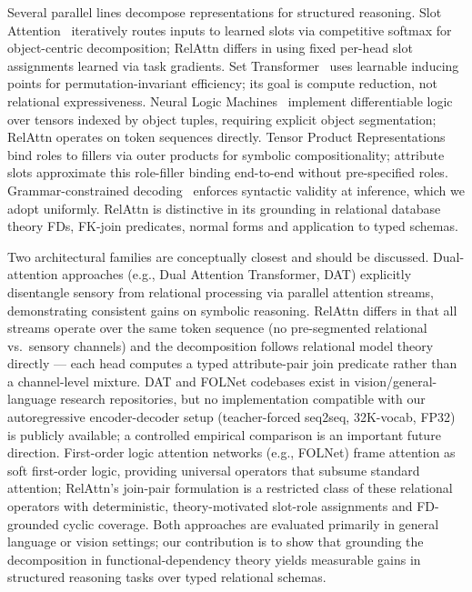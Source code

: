 \documentclass[review]{elsarticle}
\begin{document}
Several parallel lines decompose representations for structured reasoning. {Slot Attention}~\cite{locatello2020object} iteratively routes inputs to learned slots via competitive softmax for object-centric decomposition; RelAttn differs in using fixed per-head slot assignments learned via task gradients. {Set Transformer}~\cite{lee2019set} uses learnable inducing points for permutation-invariant efficiency; its goal is compute reduction, not relational expressiveness. {Neural Logic Machines}~\cite{dong2019nlm} implement differentiable logic over tensors indexed by object tuples, requiring explicit object segmentation; RelAttn operates on token sequences directly. {Tensor Product Representations}~\cite{smolensky1990tensor} bind roles to fillers via outer products for symbolic compositionality; attribute slots approximate this role-filler binding end-to-end without pre-specified roles. Grammar-constrained decoding~\cite{scholak2021picard} enforces syntactic validity at inference, which we adopt uniformly. RelAttn is distinctive in its grounding in relational database theory FDs, FK-join predicates, normal forms and application to typed schemas.

Two architectural families are conceptually closest and should be discussed. Dual-attention approaches (e.g., Dual Attention Transformer, DAT) explicitly disentangle sensory from relational processing via parallel attention streams, demonstrating consistent gains on symbolic reasoning. RelAttn differs in that all streams operate over the same token sequence (no pre-segmented relational vs.\ sensory channels) and the decomposition follows relational model theory directly --- each head computes a typed attribute-pair join predicate rather than a channel-level mixture. DAT and FOLNet codebases exist in vision/general-language research repositories, but no implementation compatible with our autoregressive encoder-decoder setup (teacher-forced seq2seq, 32K-vocab, FP32) is publicly available; a controlled empirical comparison is an important future direction. First-order logic attention networks (e.g., FOLNet) frame attention as soft first-order logic, providing universal operators that subsume standard attention; RelAttn's join-pair formulation is a restricted class of these relational operators with deterministic, theory-motivated slot-role assignments and FD-grounded cyclic coverage. Both approaches are evaluated primarily in general language or vision settings; our contribution is to show that grounding the decomposition in functional-dependency theory yields measurable gains in structured reasoning tasks over typed relational schemas.
\end{document}

